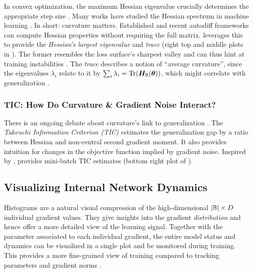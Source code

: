 In convex optimization, the maximum Hessian eigenvalue crucially determines the
appropriate step size \citep{schmidt2014convergence}. Many works have studied
the Hessian spectrum in machine learning
\citep[\eg][]{ghorbani2019investigation,ginsburg2020regularization,mulayoff2020unique,sagun2017eigenvalues,sagun2018empirical,yao2020pyhessian}.
In short: curvature matters. Established \citep{pearlmutter1994fast} and recent
autodiff frameworks \citep{dangel2020backpack} can compute Hessian properties
without requiring the full matrix. \cockpit leverages this to provide the
\textit{Hessian's largest eigenvalue} and \textit{trace} (right top and middle
plots in ). The former resembles the loss surface's
sharpest valley and can thus hint at training instabilities
\citep{jastrzebski2020break}. The \textit{trace} describes a notion of ``average
curvature'', since the eigenvalues $\lambda_i$ relate to it by $\sum_i \lambda_i
= \operatorname{Tr}({\bm{H}}_{{\mathbb{B}}}({\bm{\theta}}))$, which might correlate with generalization
\citep{jastrzebski2021catastrophic}.

\subsubsection{TIC: How Do Curvature \& Gradient Noise Interact?}

There is an ongoing debate about curvature's link to generalization
\citep[\eg][]{dinh2017sharp,hochreiter1997flat,keskar2017large}. The
\emph{Takeuchi Information Criterion (TIC)}
\citep{takeuchi1976distribution,thomas2020interplay} estimates the
generalization gap by a ratio between Hessian and non-central second gradient
moment. It also provides intuition for changes in the objective function implied
by gradient noise. Inspired by \cite{thomas2020interplay}, \cockpit provides mini-batch TIC estimates (bottom
right plot of ).

\subsection{Visualizing Internal Network Dynamics}\label{cockpit::sec:network_dynamics}
Histograms are a natural visual compression of the high-dimensional $|{\mathbb{B}}|
\times D$ individual gradient values. They give insights into the gradient
\emph{distribution} and hence offer a more detailed view of the learning signal.
Together with the parameter associated to each individual gradient, the entire
model status and dynamics can be visualized in a single plot and be monitored
during training. This provides a more fine-grained view of training compared to
tracking parameters and gradient norms \citep{frankle2020early}.

